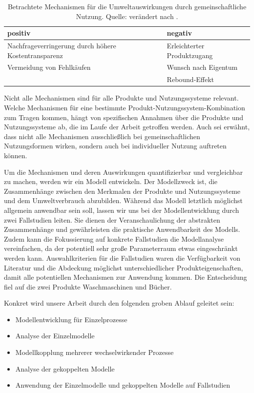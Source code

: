 \documentclass[11pt, titlepage=true]{scrartcl} %
\begin{document}
{\begin{table}[h]
\begin{tabular}{p{7cm}p{7cm}}
		 \textbf{positiv} & \textbf{negativ} \\
		 \midrule
		 Nachfrageverringerung durch höhere Kostentransparenz \vspace{0.2cm} & Erleichterter Produktzugang \vspace{0.2cm} \\
		 Vermeidung von Fehlkäufen \vspace{0.2cm} & Wunsch nach Eigentum \vspace{0.5cm} \\
		  & Rebound-Effekt \vspace{0.2cm} \\
		 \bottomrule
	\end{tabular}
	\caption{Betrachtete Mechanismen für die Umweltauswirkungen durch gemeinschaftliche Nutzung. Quelle: verändert nach \cite{scholl_marketing_2009}.}
	\label{tab:Mechanismen}
\end{table}}

Nicht alle Mechanismen sind für alle Produkte und Nutzungssysteme relevant. Welche Mechanismen für eine bestimmte Produkt-Nutzungssystem-Kombination zum Tragen kommen, hängt von spezifischen Annahmen über die Produkte und Nutzungssysteme ab, die im Laufe der Arbeit getroffen werden. Auch sei erwähnt, dass nicht alle Mechanismen ausschließlich bei gemeinschaftlichen Nutzungsformen wirken, sondern auch bei individueller Nutzung auftreten können.

Um die Mechanismen und deren Auswirkungen quantifizierbar und vergleichbar zu machen, werden wir ein Modell entwickeln. Der Modellzweck ist, die Zusammenhänge zwischen den Merkmalen der Produkte und Nutzungssysteme und dem Umweltverbrauch abzubilden. Während das Modell letztlich möglichst allgemein anwendbar sein soll, lassen wir uns bei der Modellentwicklung durch zwei Fallstudien leiten. Sie dienen der Veranschaulichung der abstrakten Zusammenhänge und gewährleisten die praktische Anwendbarkeit des Modells. Zudem kann die Fokussierung auf konkrete Fallstudien die Modellanalyse vereinfachen, da der potentiell sehr große Parameterraum etwas eingeschränkt werden kann. Auswahlkriterien für die Fallstudien waren die Verfügbarkeit von Literatur und die Abdeckung möglichst unterschiedlicher Produkteigenschaften, damit alle potentiellen Mechanismen zur Anwendung kommen. Die Entscheidung fiel auf die zwei Produkte Waschmaschinen und Bücher.

Konkret wird unsere Arbeit durch den folgenden groben Ablauf geleitet sein:
\begin{itemize}
	\item Modellentwicklung für Einzelprozesse
	\item Analyse der Einzelmodelle
	\item Modellkopplung mehrerer wechselwirkender Prozesse
	\item Analyse der gekoppelten Modelle
	\item Anwendung der Einzelmodelle und gekoppelten Modelle auf Fallstudien
\end{itemize}
\end{document}

